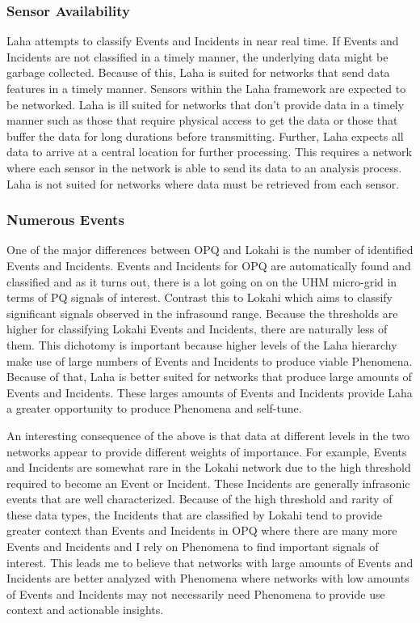 \subsubsection{Sensor Availability}
Laha attempts to classify Events and Incidents in near real time. If Events and Incidents are not classified in a timely manner, the underlying data might be garbage collected. Because of this, Laha is suited for networks that send data features in a timely manner. Sensors within the Laha framework are expected to be networked. Laha is ill suited for networks that don't provide data in a timely manner such as those that require physical access to get the data or those that buffer the data for long durations before transmitting. Further, Laha expects all data to arrive at a central location for further processing. This requires a network where each sensor in the network is able to send its data to an analysis process. Laha is not suited for networks where data must be retrieved from each sensor.

\subsubsection{Numerous Events}
One of the major differences between OPQ and Lokahi is the number of identified Events and Incidents. Events and Incidents for OPQ are automatically found and classified and as it turns out, there is a lot going on on the UHM micro-grid in terms of PQ signals of interest. Contrast this to Lokahi which aims to classify significant signals observed in the infrasound range. Because the thresholds are higher for classifying Lokahi Events and Incidents, there are naturally less of them. This dichotomy is important because higher levels of the Laha hierarchy make use of large numbers of Events and Incidents to produce viable Phenomena. Because of that, Laha is better suited for networks that produce large amounts of Events and Incidents. These larges amounts of Events and Incidents provide Laha a greater opportunity to produce Phenomena and self-tune.

An interesting consequence of the above is that data at different levels in the two networks appear to provide different weights of importance. For example, Events and Incidents are somewhat rare in the Lokahi network due to the high threshold required to become an Event or Incident. These Incidents are generally infrasonic events that are well characterized. Because of the high threshold and rarity of these data types, the Incidents that are classified by Lokahi tend to provide greater context than Events and Incidents in OPQ where there are many more Events and Incidents and I rely on Phenomena to find important signals of interest. This leads me to believe that networks with large amounts of Events and Incidents are better analyzed with Phenomena where networks with low amounts of Events and Incidents may not necessarily need Phenomena to provide use context and actionable insights.

